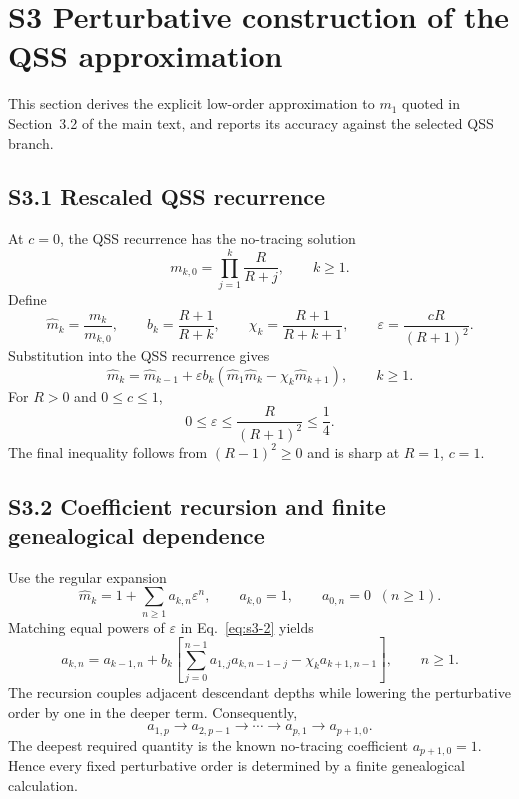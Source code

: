 \documentclass[11pt]{article}
\begin{document}
\section*{S3 Perturbative construction of the QSS approximation}
This section derives the explicit low-order approximation to $m_1$ quoted in
Section~3.2 of the main text, and reports its accuracy against the selected
QSS branch.

\subsection*{S3.1 Rescaled QSS recurrence}

At $c=0$, the QSS recurrence has the no-tracing solution
\begin{equation}
m_{k,0}=\prod_{j=1}^{k}\frac{R}{R+j},
\qquad k\geq1.
\end{equation}
Define
\begin{equation}
\widehat m_k=\frac{m_k}{m_{k,0}},
\qquad
b_k=\frac{R+1}{R+k},
\qquad
\chi_k=\frac{R+1}{R+k+1},
\qquad
\varepsilon=\frac{cR}{(R+1)^2}.
\end{equation}
Substitution into the QSS recurrence gives
\begin{equation}
\widehat m_k=\widehat m_{k-1}+\varepsilon b_k\left(\widehat m_1\widehat m_k-\chi_k\widehat m_{k+1}\right),
\qquad k\geq1.
\label{eq:s3-2}
\end{equation}
For $R>0$ and $0\leq c\leq1$,
\begin{equation}
0\leq\varepsilon\leq\frac{R}{(R+1)^2}\leq\frac14.
\end{equation}
The final inequality follows from $(R-1)^2\geq0$ and is sharp at $R=1$, $c=1$.

\subsection*{S3.2 Coefficient recursion and finite genealogical dependence}

Use the regular expansion
\begin{equation}
\widehat m_k=1+\sum_{n\geq1}a_{k,n}\varepsilon^n,
\qquad a_{k,0}=1,
\qquad a_{0,n}=0\;\;(n\geq1).
\end{equation}
Matching equal powers of $\varepsilon$ in Eq.~\eqref{eq:s3-2} yields
\begin{equation}
a_{k,n}=a_{k-1,n}+b_k\left[\sum_{j=0}^{n-1}a_{1,j}a_{k,n-1-j}-\chi_ka_{k+1,n-1}\right],
\qquad n\geq1.
\label{eq:s3-5}
\end{equation}
The recursion couples adjacent descendant depths while lowering the perturbative order by one in the deeper term. Consequently,
\[
a_{1,p}\longrightarrow a_{2,p-1}\longrightarrow\cdots\longrightarrow a_{p,1}\longrightarrow a_{p+1,0}.
\]
The deepest required quantity is the known no-tracing coefficient $a_{p+1,0}=1$. Hence every fixed perturbative order is determined by a finite genealogical calculation.
\end{document}
